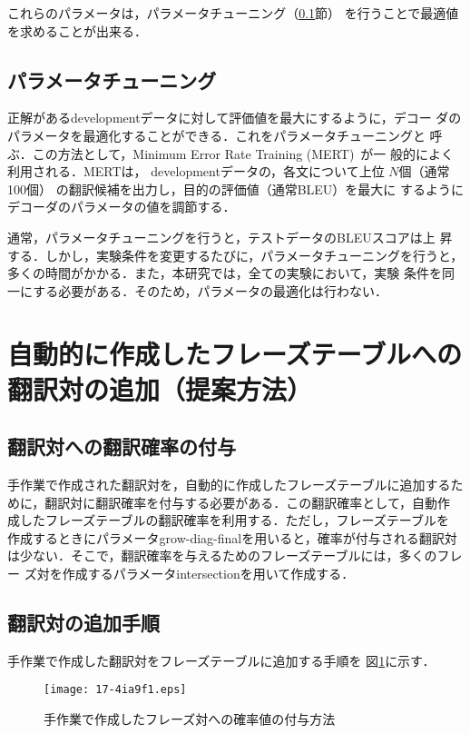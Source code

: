 \documentclass[japanese]{jnlp_1.4}
\begin{document}
これらのパラメータは，パラメータチューニング（\ref{sec:papametertuning}節）
を行うことで最適値を求めることが出来る．

\subsection{パラメータチューニング}
\label{sec:papametertuning}

正解があるdevelopmentデータに対して評価値を最大にするように，デコー
ダのパラメータを最適化することができる．これをパラメータチューニングと
呼ぶ．この方法として，Minimum Error Rate Training (MERT)~\cite{mert}が一
般的によく利用される．MERTは， developmentデータの，各文について上位
$N$個（通常100個） の翻訳候補を出力し，目的の評価値（通常BLEU）を最大に
するようにデコーダのパラメータの値を調節する．

通常，パラメータチューニングを行うと，テストデータのBLEUスコアは上
昇する．しかし，実験条件を変更するたびに，パラメータチューニングを行うと，
多くの時間がかかる．また，本研究では，全ての実験において，実験
条件を同一にする必要がある．そのため，パラメータの最適化は行わない．


\section{自動的に作成したフレーズテーブルへの翻訳対の追加（提案方法）}

\subsection{翻訳対への翻訳確率の付与}

手作業で作成された翻訳対を，自動的に作成したフレーズテーブルに追加するた
めに，翻訳対に翻訳確率を付与する必要がある．この翻訳確率として，自動作
成したフレーズテーブルの翻訳確率を利用する．ただし，フレーズテーブルを
作成するときにパラメータgrow-diag-finalを用いると，確率が付与される翻訳対
は少ない．そこで，翻訳確率を与えるためのフレーズテーブルには，多くのフレー
ズ対を作成するパラメータintersectionを用いて作成する．


\subsection{翻訳対の追加手順}

手作業で作成した翻訳対をフレーズテーブルに追加する手順を
図\ref{fig:手作業で作成したフレーズ対への確率値の付与方法}に示す．

\begin{figure}[t]
\begin{center}
\texttt{[image: 17-4ia9f1.eps]}
\end{center}
\caption{手作業で作成したフレーズ対への確率値の付与方法}
\label{fig:手作業で作成したフレーズ対への確率値の付与方法}
\end{figure}
\end{document}
